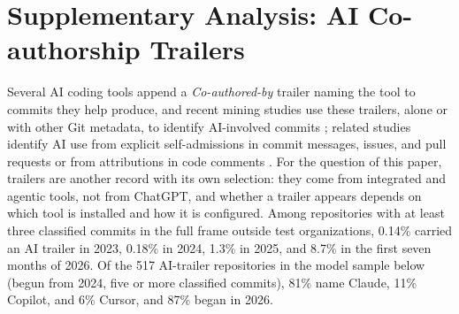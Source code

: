 \documentclass[acmsmall,screen,review,anonymous]{acmart}
\begin{document}


\FloatBarrier
\section{Supplementary Analysis: AI Co-authorship Trailers}
\label{app:trailers}

Several AI coding tools append a \textit{Co-authored-by} trailer naming the tool to commits they help produce, and recent mining studies use these trailers, alone or with other Git metadata, to identify AI-involved commits \citep{khosravani2026census, quispe2026coding, liu2026debt}; related studies identify AI use from explicit self-admissions in commit messages, issues, and pull requests \citep{tufano2026selfadmitted} or from attributions in code comments \citep{mao2026largescale}. For the question of this paper, trailers are another record with its own selection: they come from integrated and agentic tools, not from ChatGPT, and whether a trailer appears depends on which tool is installed and how it is configured. Among repositories with at least three classified commits in the full frame outside test organizations, 0.14\% carried an AI trailer in 2023, 0.18\% in 2024, 1.3\% in 2025, and 8.7\% in the first seven months of 2026. Of the 517 AI-trailer repositories in the model sample below (begun from 2024, five or more classified commits), 81\% name Claude, 11\% Copilot, and 6\% Cursor, and 87\% began in 2026.
\end{document}
